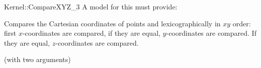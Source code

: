 \begin{ccRefFunctionObjectConcept}{Kernel::CompareXYZ_3}
A model for this must provide:


      {Compares the Cartesian coordinates of points  and
        lexicographically in $xy$ order: first 
       $x$-coordinates are compared, if they are equal, $y$-coordinates
       are compared. If they are equal, $z$-coordinates are compared.}

\ccRefines
{} (with two arguments)

\ccSeeAlso
{} \\

\end{ccRefFunctionObjectConcept}
